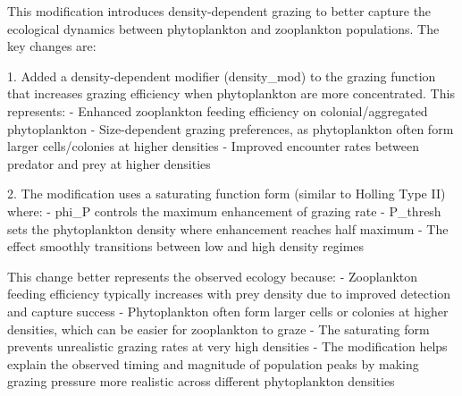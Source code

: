 This modification introduces density-dependent grazing to better capture the ecological dynamics between phytoplankton and zooplankton populations. The key changes are:

1. Added a density-dependent modifier (density_mod) to the grazing function that increases grazing efficiency when phytoplankton are more concentrated. This represents:
   - Enhanced zooplankton feeding efficiency on colonial/aggregated phytoplankton
   - Size-dependent grazing preferences, as phytoplankton often form larger cells/colonies at higher densities
   - Improved encounter rates between predator and prey at higher densities

2. The modification uses a saturating function form (similar to Holling Type II) where:
   - phi_P controls the maximum enhancement of grazing rate
   - P_thresh sets the phytoplankton density where enhancement reaches half maximum
   - The effect smoothly transitions between low and high density regimes

This change better represents the observed ecology because:
- Zooplankton feeding efficiency typically increases with prey density due to improved detection and capture success
- Phytoplankton often form larger cells or colonies at higher densities, which can be easier for zooplankton to graze
- The saturating form prevents unrealistic grazing rates at very high densities
- The modification helps explain the observed timing and magnitude of population peaks by making grazing pressure more realistic across different phytoplankton densities
